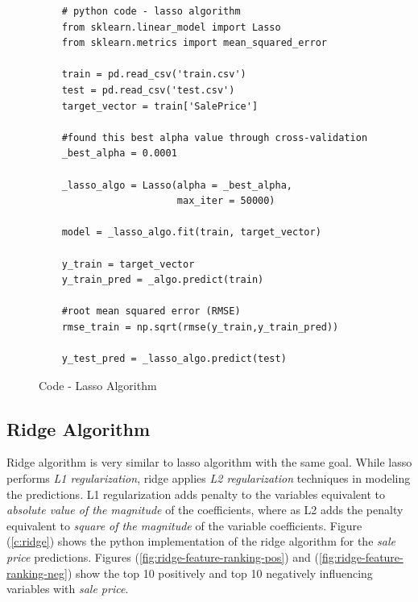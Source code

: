 \documentclass[sigconf]{acmart}
\begin{document}
	\begin{figure}[htb]
	\begin{verbatim}	
	# python code - lasso algorithm
	from sklearn.linear_model import Lasso
	from sklearn.metrics import mean_squared_error
	
	train = pd.read_csv('train.csv')
	test = pd.read_csv('test.csv')
	target_vector = train['SalePrice']
	
	#found this best alpha value through cross-validation
	_best_alpha = 0.0001	
	
	_lasso_algo = Lasso(alpha = _best_alpha, 
	                    max_iter = 50000)
	
	model = _lasso_algo.fit(train, target_vector)  
		
	y_train = target_vector
	y_train_pred = _algo.predict(train)
	
	#root mean squared error (RMSE)
	rmse_train = np.sqrt(rmse(y_train,y_train_pred))
		
	y_test_pred = _lasso_algo.predict(test)	
	\end{verbatim}
	\caption{Code - Lasso Algorithm} \label{c:lasso} 
	\end{figure}
	
	\subsection{Ridge Algorithm}
	
	Ridge algorithm is very similar to lasso algorithm with the same goal. While lasso performs {\em L1 regularization}, ridge applies {\em L2 regularization} techniques in modeling the predictions. L1 regularization adds penalty to the variables equivalent to {\em absolute value of the magnitude} of the coefficients, where as L2 adds the penalty equivalent to {\em square of the magnitude} of the variable coefficients. Figure (\ref{c:ridge}) shows the python implementation of the ridge algorithm for the {\em sale price} predictions. Figures ({\ref{fig:ridge-feature-ranking-pos}}) and (\ref{fig:ridge-feature-ranking-neg}) show the top 10 positively and top 10 negatively influencing variables with {\em sale price}.
		
\end{document}
